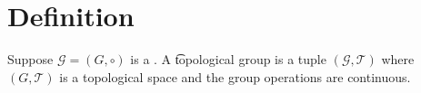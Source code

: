 

\section*{Definition}

Suppose $\mathcal{G}  = (G, \circ)$ is a .
A \t{topological group} is a tuple $(\mathcal{G} , \mathcal{T} )$ where $(G, \mathcal{T} )$ is a topological space and the group operations are continuous.

\blankpage